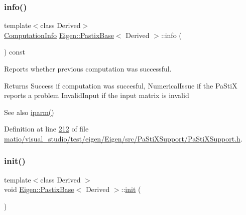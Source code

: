 \mbox{\label{class_eigen_1_1_pastix_base_a436e99a385c9c019be9627cc1fa884cf}} 
\subsubsection{\texorpdfstring{info()}{info()}\hspace{0.1cm}{\footnotesize\ttfamily [2/2]}}
{\footnotesize\ttfamily template$<$class Derived$>$ \\
\hyperlink{group__enums_ga85fad7b87587764e5cf6b513a9e0ee5e}{Computation\+Info} \hyperlink{class_eigen_1_1_pastix_base}{Eigen\+::\+Pastix\+Base}$<$ Derived $>$\+::info (\begin{DoxyParamCaption}{ }\end{DoxyParamCaption}) const\hspace{0.3cm}{\ttfamily [inline]}}



Reports whether previous computation was successful. 

\begin{DoxyReturn}{Returns}
{\ttfamily Success} if computation was succesful, {\ttfamily Numerical\+Issue} if the Pa\+StiX reports a problem {\ttfamily Invalid\+Input} if the input matrix is invalid
\end{DoxyReturn}
\begin{DoxySeeAlso}{See also}
\hyperlink{class_eigen_1_1_pastix_base_a38378e7b2b5c750a8a23e2c21a69146c}{iparm()} 
\end{DoxySeeAlso}


Definition at line \hyperlink{matio_2visual__studio_2test_2eigen_2_eigen_2src_2_pa_sti_x_support_2_pa_sti_x_support_8h_source_l00212}{212} of file \hyperlink{matio_2visual__studio_2test_2eigen_2_eigen_2src_2_pa_sti_x_support_2_pa_sti_x_support_8h_source}{matio/visual\+\_\+studio/test/eigen/\+Eigen/src/\+Pa\+Sti\+X\+Support/\+Pa\+Sti\+X\+Support.\+h}.

\mbox{\label{class_eigen_1_1_pastix_base_ac6202714edd1943646e34f16ad384336}} 
\subsubsection{\texorpdfstring{init()}{init()}}
{\footnotesize\ttfamily template$<$class Derived $>$ \\
void \hyperlink{class_eigen_1_1_pastix_base}{Eigen\+::\+Pastix\+Base}$<$ Derived $>$\+::\hyperlink{structinit}{init} (\begin{DoxyParamCaption}{ }\end{DoxyParamCaption})\hspace{0.3cm}{\ttfamily [protected]}}

